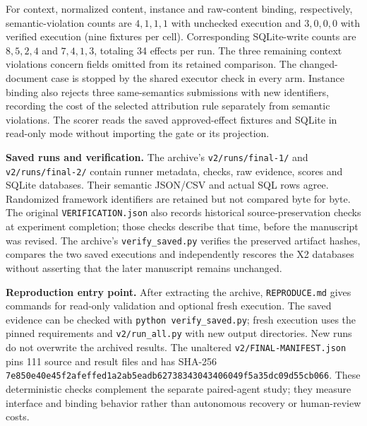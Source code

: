 For context, normalized content, instance and raw-content binding,
respectively, semantic-violation counts are $4,1,1,1$ with unchecked
execution and $3,0,0,0$ with verified execution (nine fixtures per cell).
Corresponding SQLite-write counts are $8,5,2,4$ and $7,4,1,3$, totaling
34 effects per run. The three remaining context violations concern fields
omitted from its retained comparison. The changed-document case is
stopped by the shared executor check in every arm. Instance binding also
rejects three same-semantics submissions with new identifiers, recording
the cost of the selected attribution rule separately from semantic
violations. The scorer reads the saved approved-effect fixtures and
SQLite in read-only mode without importing the gate or its projection.

\textbf{Saved runs and verification.}
The archive's \texttt{v2/runs/final-1/} and
\texttt{v2/runs/final-2/} contain runner metadata, checks, raw evidence,
scores and SQLite databases. Their semantic JSON/CSV and actual SQL rows
agree. Randomized framework identifiers are retained but not compared
byte for byte. The original \texttt{VERIFICATION.json} also records
historical source-preservation checks at experiment completion; those
checks describe that time, before the manuscript was revised.
The archive's \texttt{verify\_saved.py} verifies the preserved artifact
hashes, compares the two saved executions and independently rescores
the X2 databases without asserting that the later manuscript remains
unchanged.

\textbf{Reproduction entry point.}
After extracting the archive, \texttt{REPRODUCE.md} gives commands for
read-only validation and optional fresh execution. The saved evidence can
be checked with \texttt{python verify\_saved.py}; fresh execution uses
the pinned requirements and \texttt{v2/run\_all.py} with new output
directories. New runs do not overwrite the archived results. The
unaltered \texttt{v2/FINAL-MANIFEST.json} pins 111 source and result files
and has SHA-256
\nolinkurl{7e850e40e45f2afeffed1a2ab5eadb62738343043406049f5a35dc09d55cb066}.
These deterministic checks complement the separate paired-agent study;
they measure interface and binding behavior rather than autonomous
recovery or human-review costs.
